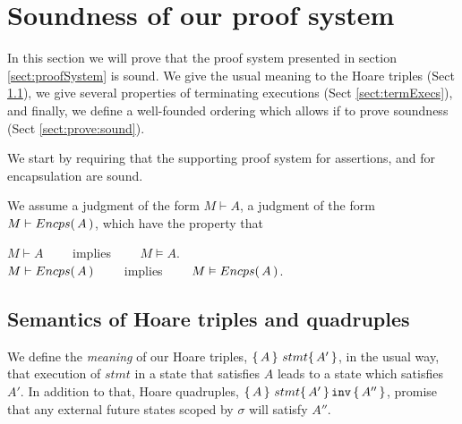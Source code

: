 \section{Soundness of our proof system}



In this section we will prove that the proof system presented in section \ref{sect:proofSystem} is sound. We give the usual meaning to the Hoare triples (Sect \ref{sect:HLmeans}), we give several properties of terminating executions (Sect \ref{sect:termExecs}), and finally, we define a well-founded ordering which allows if to prove soundness (Sect \ref{sect:prove:sound}).

We start by requiring  that the supporting proof system for assertions, and for encapsulation are sound.
\begin{axiom}
\label{lemma:axiom:enc:assert}
We assume a judgment of the form $M \vdash A$,  a judgment of the form $M \vdash {\ensuremath Encps(\, A\, )}$, which have the property that
\begin{center}
$M \vdash A $ \ \ \ \ implies \ \ \ \ $M \vDash A$.\\
 $M \vdash {\ensuremath Encps(\, A\, )} $ \ \ \ \ implies \ \ \ \ $M \vDash {\ensuremath Encps(\, A\, )}$.
 \end{center}
\end{axiom}


\subsection{Semantics of Hoare triples and quadruples}
\label{sect:HLmeans}

We  define the {\emph {meaning}} of  our Hoare triples, $ \{\, A \, \}\ stmt \{\, A' \, \}$,  in the usual way, \ie that execution of $stmt$ in a state that satisfies $A$ leads to a state which satisfies $A'$.  
In addition to that, Hoare quadruples, $ \{\, A \, \}\ stmt \{\, A' \, \} \, {\texttt{inv}}\, \{\, A'' \, \} $, promise that any external future states scoped by $\sigma$ will satisfy $A''$.

